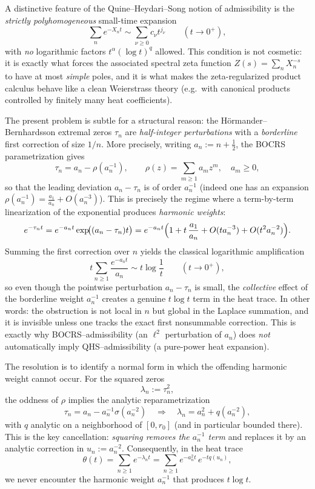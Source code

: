 \documentclass[11pt,letterpaper]{amsart}
\numberwithin{equation}{section}
\theoremstyle{definition}
\begin{document}
A distinctive feature of the Quine--Heydari--Song notion of admissibility is the \emph{strictly
polyhomogeneous} small-time expansion
\[
\sum_{n}e^{-X_n t}\sim \sum_{\nu\ge 0}c_\nu t^{j_\nu}\qquad(t\to 0^+),
\]
with \emph{no} logarithmic factors $t^\alpha(\log t)^q$ allowed.
This condition is not cosmetic: it is exactly what forces the associated spectral zeta function
$Z(s)=\sum_n X_n^{-s}$ to have at most \emph{simple} poles, and it is what makes the zeta-regularized product calculus behave like a clean Weierstrass theory (e.g.\ with canonical products controlled by finitely many heat coefficients).

The present problem is subtle for a structural reason: the
H\"ormander--Bernhardsson extremal zeros $\tau_n$ are \emph{half-integer perturbations} with a
\emph{borderline} first correction of size $1/n$.  More precisely, writing $a_n:=n+\tfrac12$,
the BOCRS parametrization gives
\[
\tau_n = a_n-\rho(a_n^{-1}),\qquad \rho(z)=\sum_{m\ge1}a_m z^m,\quad a_m\ge0,
\]
so that the leading deviation $a_n-\tau_n$ is of order $a_n^{-1}$ (indeed one has an expansion
$\rho(a_n^{-1})=\frac{a_1}{a_n}+O(a_n^{-3})$).
This is precisely the regime where a term-by-term linearization of the exponential produces
\emph{harmonic weights}:
\[
e^{-\tau_n t}=e^{-a_n t}\exp\!\bigl((a_n-\tau_n)t\bigr)
= e^{-a_n t}\Bigl(1+t\,\frac{a_1}{a_n}+O(t a_n^{-3})+O(t^2 a_n^{-2})\Bigr).
\]
Summing the first correction over $n$ yields the classical logarithmic amplification
\[
t\sum_{n\ge 1}\frac{e^{-a_n t}}{a_n}
\sim t\log\!\frac1t \qquad (t\to 0^+),
\]
so even though the pointwise perturbation $a_n-\tau_n$ is small, the \emph{collective} effect of
the borderline weight $a_n^{-1}$ creates a genuine $t\log t$ term in the heat trace.
In other words: the obstruction is not local in $n$ but global in the Laplace summation, and it is
invisible unless one tracks the exact first nonsummable correction.  This is exactly why
BOCRS--admissibility (an $\ell^2$ perturbation of $a_n$) does \emph{not} automatically imply
QHS--admissibility (a pure-power heat expansion).

The resolution is to identify a normal form in which the offending harmonic weight cannot occur.
For the squared zeros
\[
\lambda_n:=\tau_n^2,
\]
the oddness of $\rho$ implies the analytic reparametrization
\[
\tau_n=a_n-a_n^{-1}\sigma(a_n^{-2})
\quad\Longrightarrow\quad
\lambda_n=a_n^2+q(a_n^{-2}),
\]
with $q$ analytic on a neighborhood of $[0,r_0]$ (and in particular bounded there).
This is the key cancellation: \emph{squaring removes the $a_n^{-1}$ term} and replaces it by an
analytic correction in $u_n:=a_n^{-2}$.
Consequently, in the heat trace
\[
\theta(t)=\sum_{n\ge1}e^{-\lambda_n t}
=\sum_{n\ge1}e^{-a_n^2 t}\,e^{-t q(u_n)},
\]
we never encounter the harmonic weight $a_n^{-1}$ that produces $t\log t$.
\end{document}
